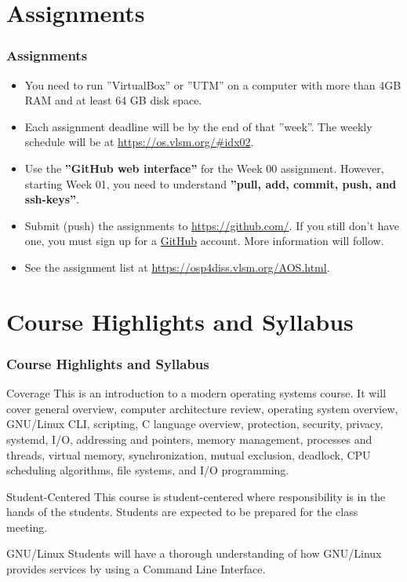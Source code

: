\documentclass[aspectratio=169, xcolor=table, notheorems, hyperref={pdfpagelabels=false}]{beamer}
\begin{document}
\section{Assignments}
\begin{frame}[fragile]
\frametitle{Assignments}
\begin{itemize}
\item You need to run ''VirtualBox'' or ''UTM'' on a computer with more than 4GB RAM and at least 64 GB disk space.
\item Each assignment deadline will be by the end of that ''week''. 
      The weekly schedule will be at \url{https://os.vlsm.org/\#idx02}.
\item Use the \textbf{''GitHub web interface''} for the Week 00 assignment.
      However, starting Week 01, you need to understand \textbf{''pull, add, commit, push, and ssh-keys''}.
\item Submit (push) the assignments to \url{https://github.com/}.
      If you still don't have one, you must sign up for a \href{https://github.com/}{GitHub} account.
      More information will follow.
\item See the assignment list at \url{https://osp4diss.vlsm.org/AOS.html}.
\end{itemize}
\end{frame}

\section{Course Highlights and Syllabus} 
\begin{frame}
\frametitle{Course Highlights and Syllabus}
\begin{block}{Coverage}
This is an introduction to a modern operating systems course. 
It will cover
general overview,
computer architecture review,
operating system overview,
GNU/Linux CLI,
scripting,
C language overview,
protection,
security,
privacy,
systemd,
I/O,
addressing and pointers,
memory management, 
processes and threads, 
virtual memory,
synchronization,
mutual exclusion, 
deadlock, 
CPU scheduling algorithms, 
file systems,
and
I/O programming.
\end{block}

\begin{block}{Student-Centered}
This course is student-centered where responsibility is
in the hands of the students. Students are expected to 
be prepared for the class meeting.
\end{block}

\begin{block}{GNU/Linux}
Students will have a thorough understanding of how GNU/Linux 
provides services by using a Command Line Interface.
\end{block}

\end{frame}
\end{document}
